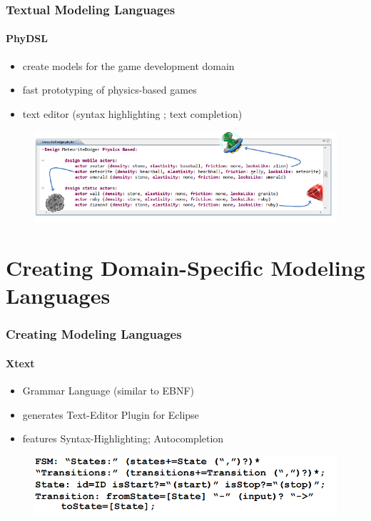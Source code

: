 \documentclass[11 pt,t]{beamer}
\begin{document}
\begin{frame}
\vspace{.5cm}
  \frametitle{Textual Modeling Languages}
  \framesubtitle{PhyDSL}
  \begin{itemize}
   \item create models for the game development domain
   \item fast prototyping of physics-based games
   \item text editor (syntax highlighting ; text completion)
  \end{itemize}

  \begin{figure}[hbtp]
      \centering
      \includegraphics[width=\textwidth]{images/PhyDSL1.PNG}
    \end{figure}
\end{frame}

\section{Creating Domain-Specific Modeling Languages}
\begin{frame}
\vspace{.5cm}
  \frametitle{Creating Modeling Languages}
  \framesubtitle{Xtext}
  \begin{itemize}
    \item Grammar Language (similar to EBNF)
    \item generates Text-Editor Plugin for Eclipse
    \item features Syntax-Highlighting; Autocompletion
  \end{itemize}
  \begin{figure}[hbtp]
      \centering
      \includegraphics[width=\textwidth]{images/XTextGrammar.PNG}
    \end{figure}
\end{frame}
\end{document}
